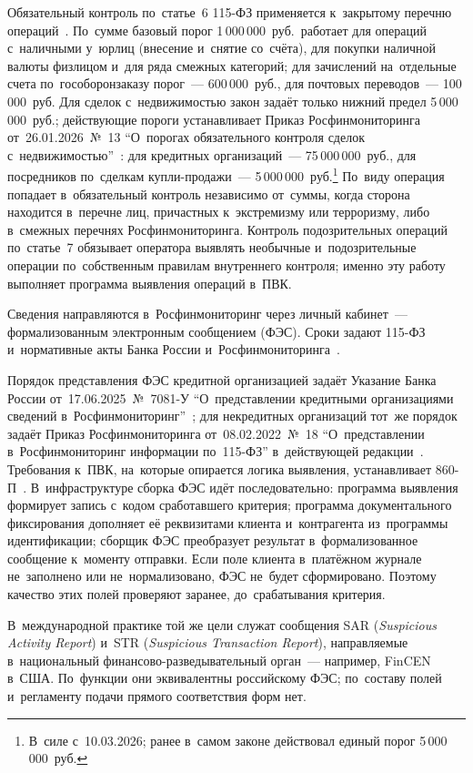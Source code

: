 Обязательный контроль по~статье~6 115-ФЗ применяется к~закрытому перечню
операций~\cite{fz-115}. По~сумме базовый порог 1\,000\,000~руб.\ работает для
операций с~наличными у~юрлиц (внесение и~снятие со~счёта), для покупки наличной
валюты физлицом и~для ряда смежных категорий; для зачислений на~отдельные счета
по~гособоронзаказу порог~--- 600\,000~руб., для почтовых переводов~---
100\,000~руб. Для сделок с~недвижимостью закон задаёт только нижний предел
5\,000\,000~руб.; действующие пороги устанавливает Приказ Росфинмониторинга
от~26.01.2026~№~13 \enquote{О~порогах обязательного контроля сделок
с~недвижимостью}~\cite{rosfinmonitoring-13}: для кредитных организаций~---
75\,000\,000~руб., для посредников по~сделкам купли-продажи~---
5\,000\,000~руб.\footnote{В~силе с~10.03.2026; ранее в~самом законе действовал
единый порог 5\,000\,000~руб.}
По~виду операция попадает в~обязательный контроль независимо от~суммы, когда
сторона находится в~перечне лиц, причастных к~экстремизму или терроризму, либо
в~смежных перечнях Росфинмониторинга. Контроль подозрительных операций
по~статье~7 обязывает оператора выявлять необычные и~подозрительные операции
по~собственным правилам внутреннего контроля; именно эту работу выполняет
программа выявления операций в~ПВК.

Сведения направляются в~Росфинмониторинг через личный кабинет~---
формализованным электронным сообщением (ФЭС). Сроки задают 115-ФЗ и~нормативные
акты Банка России и~Росфинмониторинга~\cite{fz-115,cbr-860p,cbr-7081u}.

Порядок представления ФЭС кредитной организацией задаёт Указание Банка России
от~17.06.2025~№~7081-У \enquote{О~представлении кредитными организациями
сведений в~Росфинмониторинг}~\cite{cbr-7081u}; для некредитных организаций
тот~же порядок задаёт Приказ Росфинмониторинга от~08.02.2022~№~18
\enquote{О~представлении в~Росфинмониторинг информации по~115-ФЗ}
в~действующей редакции~\cite{rosfinmonitoring-oes}. Требования к~ПВК, на~которые опирается
логика выявления, устанавливает 860-П~\cite{cbr-860p}. В~инфраструктуре сборка
ФЭС идёт последовательно: программа выявления формирует запись с~кодом
сработавшего критерия; программа документального фиксирования дополняет её
реквизитами клиента и~контрагента из~программы идентификации; сборщик ФЭС
преобразует результат в~формализованное сообщение к~моменту отправки. Если поле
клиента в~платёжном журнале не~заполнено или не~нормализовано, ФЭС не~будет
сформировано. Поэтому качество этих полей проверяют заранее, до~срабатывания
критерия.

В~международной практике той же цели служат сообщения SAR (\textit{Suspicious
Activity Report}) и~STR (\textit{Suspicious Transaction Report}), направляемые
в~национальный финансово-разведывательный орган~--- например, FinCEN в~США.
По~функции они эквивалентны российскому ФЭС; по~составу полей и~регламенту
подачи прямого соответствия форм нет.

